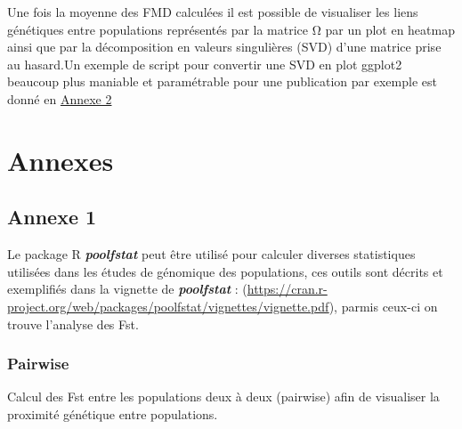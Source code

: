 \documentclass[
  openany]{book}
\theoremstyle{definition}
\theoremstyle{definition}
\theoremstyle{definition}
\theoremstyle{definition}
\theoremstyle{remark}
\begin{document}
Une fois la moyenne des FMD calculées il est possible de visualiser les liens génétiques entre populations représentés par la matrice Ω par un plot en heatmap ainsi que par la décomposition en valeurs singulières (SVD) d'une matrice prise au hasard.Un exemple de script pour convertir une SVD en plot ggplot2 beaucoup plus maniable et paramétrable pour une publication par exemple est donné en \protect\hyperlink{An2}{Annexe 2}

\hypertarget{annexes}{%
\chapter*{Annexes}\label{annexes}}

\hypertarget{An1}{%
\section*{Annexe 1}\label{An1}}

Le package R \textbf{\emph{poolfstat}} peut être utilisé pour calculer diverses statistiques utilisées dans les études de génomique des populations, ces outils sont décrits et exemplifiés dans la vignette de \textbf{\emph{poolfstat}} : (\url{https://cran.r-project.org/web/packages/poolfstat/vignettes/vignette.pdf}), parmis ceux-ci on trouve l'analyse des Fst.

\hypertarget{pairwise}{%
\subsection*{Pairwise}\label{pairwise}}

Calcul des Fst entre les populations deux à deux (pairwise) afin de visualiser la proximité génétique entre populations.
\end{document}
